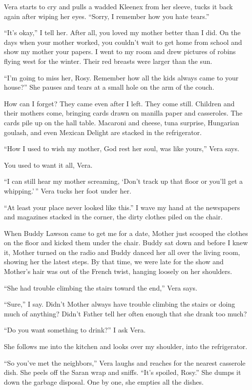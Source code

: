 \documentclass[twoside,10pt]{book}
\begin{document}
Vera starts to cry and pulls a wadded Kleenex from her sleeve, tucks it
back again after wiping her eyes. ``Sorry, I remember how you hate
tears.''

``It's okay,'' I tell her. After all, you loved my mother better than I
did. On the days when your mother worked, you couldn't wait to get home
from school and show my mother your papers. I went to my room and drew
pictures of robins flying west for the winter. Their red breasts were
larger than the sun.

``I'm going to miss her, Rosy. Remember how all the kids always came to
your house?'' She pauses and tears at a small hole on the arm of the
couch.

How can I forget? They came even after I left. They come still. Children
and their mothers come, bringing cards drawn on manilla paper and
casseroles. The cards pile up on the hall table. Macaroni and cheese,
tuna surprise, Hungarian goulash, and even Mexican Delight are stacked
in the refrigerator.

``How I used to wish my mother, God rest her soul, was like yours,''
Vera says.

You used to want it all, Vera.

``I can still hear my mother screaming, `Don't track up that floor or
you'll get a whipping.'\,'' Vera tucks her foot under her.

``At least your place never looked like this.'' I wave my hand at the
newspapers and magazines stacked in the corner, the dirty clothes piled
on the chair.

When Buddy Lawson came to get me for a date, Mother just scooped the
clothes on the floor and kicked them under the chair. Buddy sat down and
before I knew it, Mother turned on the radio and Buddy danced her all
over the living room, showing her the latest steps. By that time, we
were late for the show and Mother's hair was out of the French twist,
hanging loosely on her shoulders.

``She had trouble climbing the stairs toward the end,'' Vera says.

``Sure,'' I say. Didn't Mother always have trouble climbing the stairs
or doing much of any­thing? Didn't Father tell her often enough that she
drank too much?

``Do you want something to drink?'' I ask Vera.

She follows me into the kitchen and looks over my shoulder, into the
refrigerator.

``So you've met the neighbors,'' Vera laughs and reaches for the nearest
casserole dish. She peels off the Saran wrap and sniffs. ``It's spoiled,
Rosy.'' She dumps it down the garbage disposal. One by one, she empties
all the dishes.
\end{document}
